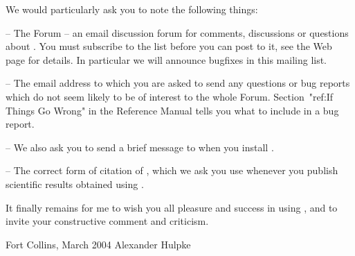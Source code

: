 
We would particularly ask you to note the following things:
\beginlist%
\item{--} The  {\GAP} Forum -- an email discussion forum for comments,
discussions or questions about {\GAP}. You must subscribe to the list
before you can post to it, see the Web page for details.
In  particular we will announce bugfixes in this mailing list.
\item{--} The email address  to which you
are asked to send any questions or bug reports which do not seem likely
to be of interest to the whole {\GAP} Forum. Section~"ref:If Things Go Wrong"
in the Reference Manual tells you what to include in a bug report.
\item{--} We also ask you to send a brief message to  when you install {\GAP}.
\item{--} The correct form of citation of {\GAP}, which we ask you use
whenever you publish scientific results obtained using {\GAP}.
\endlist

It finally remains  for me to wish you  all pleasure and success in using
{\GAP}, and to invite your constructive comment and criticism.
\bigskip\bigskip

Fort Collins, March 2004 \hfill Alexander Hulpke


